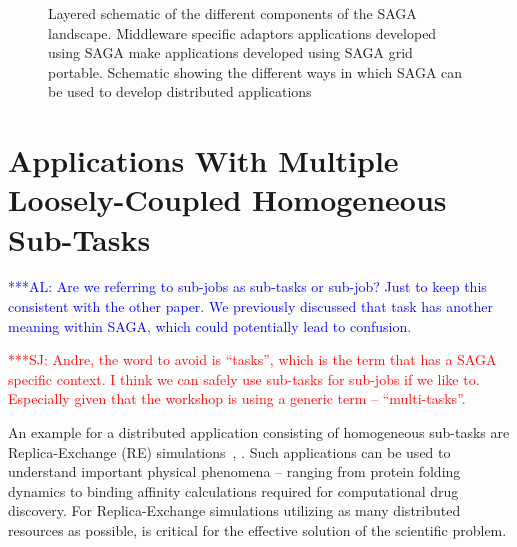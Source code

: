 \documentclass[conference,final]{IEEEtran}
\newcommand{\alnote}[1]{ {\textcolor{blue} { ***AL: #1 }}}
\newcommand{\jhanote}[1]{ {\textcolor{red} { ***SJ: #1 }}}
\newcommand{\alnote}[1]{}
\newcommand{\jhanote}[1]{}
\begin{document}
\begin{figure}[!h]
  \begin{center}
  \end{center}
  \caption{Layered schematic of the different components of the SAGA
    landscape.  Middleware specific adaptors applications developed
    using SAGA make applications developed using SAGA grid
    portable. Schematic showing the different ways in which SAGA can
    be used to develop distributed applications}
 \label{sagalayer}
\end{figure}


\section{Applications With Multiple Loosely-Coupled Homogeneous
  Sub-Tasks}  

\alnote{Are we referring to sub-jobs as sub-tasks or sub-job? Just to
  keep this consistent with the other paper. We previously discussed
  that task has another meaning within SAGA, which could potentially
  lead to confusion.}
  
\jhanote{Andre, the word to avoid is ``tasks'', which is the term that
  has a SAGA specific context. I think we can safely use sub-tasks for
  sub-jobs if we like to. Especially given that the workshop is using
  a generic term -- ``multi-tasks''.}

An example for a distributed application consisting of homogeneous
sub-tasks are Replica-Exchange (RE) simulations~\cite{Sugita:1999rm},
\cite{hansmann}. Such applications can be used to understand important
physical phenomena -- ranging from protein folding dynamics to binding
affinity calculations required for computational drug discovery.  For
Replica-Exchange simulations utilizing as many distributed resources
as possible, is critical for the effective solution of the scientific
problem.
\end{document}
